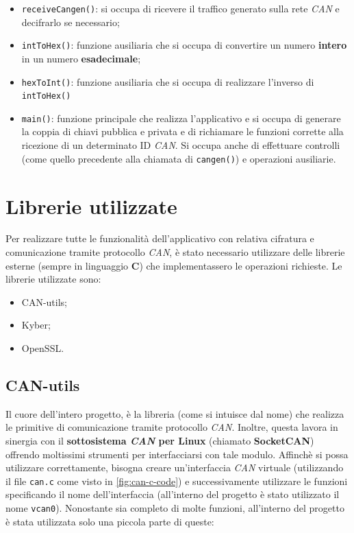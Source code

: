 \begin{itemize}
    \item \texttt{receiveCangen()}: si occupa di ricevere il traffico generato sulla rete \emph{CAN} e decifrarlo se necessario;
    \item \texttt{intToHex()}: funzione ausiliaria che si occupa di convertire un numero \textbf{intero} in un numero \textbf{esadecimale};
    \item \texttt{hexToInt()}: funzione ausiliaria che si occupa di realizzare l'inverso di \texttt{intToHex()}
    \item \texttt{main()}: funzione principale che realizza l'applicativo e si occupa di generare la coppia di chiavi pubblica e privata e di richiamare le funzioni corrette alla ricezione di un determinato ID \emph{CAN}. Si occupa anche di effettuare controlli (come quello precedente alla chiamata di \texttt{cangen()}) e operazioni ausiliarie.
\end{itemize}

\section{Librerie utilizzate}
Per realizzare tutte le funzionalità dell'applicativo con relativa cifratura e comunicazione tramite protocollo \emph{CAN}, è stato necessario utilizzare delle librerie esterne (sempre in linguaggio \textbf{C}) che implementassero le operazioni richieste. Le librerie utilizzate sono:
\begin{itemize}
    \item CAN-utils;
    \item Kyber;
    \item OpenSSL.
\end{itemize} 

\subsection{CAN-utils}
Il cuore dell'intero progetto, è la libreria (come si intuisce dal nome) che realizza le primitive di comunicazione tramite protocollo \emph{CAN}. Inoltre, questa lavora in sinergia con il \textbf{sottosistema \emph{CAN} per Linux} (chiamato \textbf{SocketCAN}) offrendo moltissimi strumenti per interfacciarsi con tale modulo. Affinchè si possa utilizzare correttamente, bisogna creare un'interfaccia \emph{CAN} virtuale (utilizzando il file \texttt{can.c} come visto in \autoref{fig:can-c-code}) e successivamente utilizzare le funzioni specificando il nome dell'interfaccia (all'interno del progetto è stato utilizzato il nome \texttt{vcan0}). Nonostante sia completo di molte funzioni, all'interno del progetto è stata utilizzata solo una piccola parte di queste:

